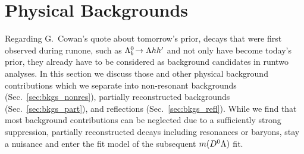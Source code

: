 \chapter{Physical Backgrounds}
\label{chap:bkgs}
Regarding G.~Cowan's quote about tomorrow's prior, decays that were first observed during \gls{runone}, such as ${{\Lambda}^0_{b}}\!\rightarrow {\ensuremath{\Lambda}}hh'$ and \decay{\Bsb}{\Dz\KS} not only have become today's prior, they already have to be considered as background candidates in \gls{runtwo} analyses.
In this section we discuss those and other physical background contributions which we separate into non-resonant backgrounds (Sec.~\ref{sec:bkgs_nonres}), partially reconstructed backgrounds (Sec.~\ref{sec:bkgs_part}), and \glspl{reflection} (Sec.~\ref{sec:bkgs_refl}).
While we find that most background contributions can be neglected due to a sufficiently strong suppression, partially reconstructed decays including \Dstarz resonances or \Sz baryons, stay a nuisance and enter the fit model of the subsequent $m({{D}^0}{\Lambda})$ fit.

